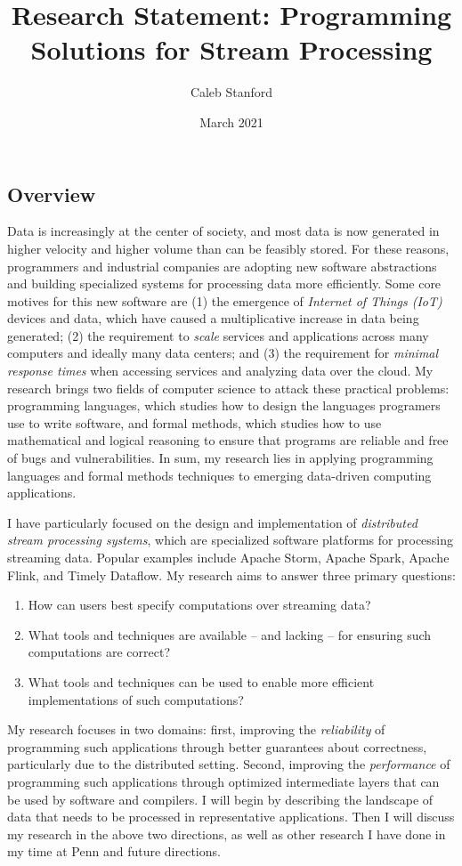 \documentclass{article}
\title{Research Statement: Programming Solutions for Stream Processing}
\author{Caleb Stanford}
\date{March 2021}
\begin{document}
\maketitle{}

\subsection*{Overview}

Data is increasingly at the center of society, and most data is now generated in higher velocity and higher volume than can be feasibly stored.
For these reasons, programmers and industrial companies are adopting new software abstractions
and building specialized systems for processing data more efficiently.
Some core motives for this new software are (1) the emergence of \emph{Internet of Things (IoT)} devices and data, which have caused a multiplicative increase in data being generated; (2) the requirement to \emph{scale} services and applications across many computers and ideally many data centers; and (3)
the requirement for \emph{minimal response times} when accessing services and analyzing data over the cloud.
My research brings two fields of computer science to attack these practical problems: programming languages, which studies how to design the languages programers use to write software, and formal methods, which studies how to use mathematical and logical reasoning to ensure that programs are reliable and free of bugs and vulnerabilities.
In sum,
my research lies in applying programming languages and formal methods techniques to emerging data-driven computing applications.

I have particularly focused on the design and implementation of \emph{distributed stream processing systems}, which are specialized software platforms for processing streaming data. Popular examples include Apache Storm, Apache Spark, Apache Flink, and Timely Dataflow.
My research aims to answer three primary questions:
\begin{enumerate}
\item How can users best specify computations over streaming data?
\item What tools and techniques are available -- and lacking -- for ensuring such computations are correct?
\item What tools and techniques can be used to enable more efficient implementations of such computations?
\end{enumerate}

My research focuses in two domains: first, improving the \emph{reliability} of programming such applications through better guarantees about correctness, particularly due to the distributed setting. Second, improving the \emph{performance} of programming such applications through optimized intermediate layers that can be used by software and compilers.
I will begin by describing the landscape of data that needs to be processed in representative applications.
Then I will discuss my research in the above two directions, as well as other research I have done in my time at Penn and future directions.
\end{document}
